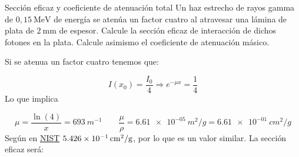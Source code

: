 \begingroup
\makeatletter
\let\old@floatboxreset\@floatboxreset
\def\@floatboxreset{\old@floatboxreset\centering} %
\makeatother

\endgroup


\begingroup
\makeatletter
\let\old@floatboxreset\@floatboxreset
\def\@floatboxreset{\old@floatboxreset\centering} %
\makeatother

\endgroup



\begingroup
\makeatletter
\let\old@floatboxreset\@floatboxreset
\def\@floatboxreset{\old@floatboxreset\centering} %
\makeatother

\endgroup



\begingroup
\makeatletter
\let\old@floatboxreset\@floatboxreset
\def\@floatboxreset{\old@floatboxreset\centering} %
\makeatother

\endgroup

\begingroup
\makeatletter
\let\old@floatboxreset\@floatboxreset
\def\@floatboxreset{\old@floatboxreset\centering} %
\makeatother

\endgroup



\begin{Ejercicio}{Sección eficaz y coeficiente de atenuación total} 
    Un haz estrecho de rayos gamma de $0,15\ \text{MeV}$ de energía se atenúa un factor cuatro al atravesar una lámina de plata de $2\ \text{mm}$ de espesor. Calcule la sección eficaz de interacción de dichos fotones en la plata. Calcule asimismo el coeficiente de atenuación másico.
\end{Ejercicio}

Si se atenua un factor cuatro tenemos que: 

\begin{equation}
    I(x_0) = \frac{I_0}{4} \Rightarrow e^{-\mu x} = \frac{1}{4}
\end{equation}
Lo que implica 

\begin{equation}
    \mu = \frac{\ln (4)}{x} = 693\ \unit{m^{-1}} \qquad \frac{\mu}{\rho} = \SI{6.61e-05}{m^2/g} = \SI{6.61e-01}{cm^2/g}
\end{equation}
Según en \href{https://physics.nist.gov/PhysRefData/Xcom/html/xcom1.html}{NIST} $\SI{5.426E-01}{cm^2/g}$, por lo que es un valor similar. La sección eficaz será: 


